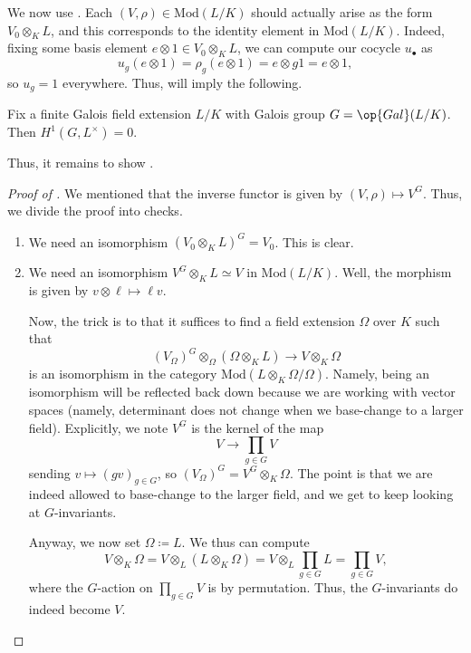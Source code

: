 \documentclass[../notes.tex]{subfiles}
\begin{document}
We now use . Each $(V,\rho)\in\mathrm{Mod}(L/K)$ should actually arise as the form $V_0\otimes_KL$, and this corresponds to the identity element in $\mathrm{Mod}(L/K)$. Indeed, fixing some basis element $e\otimes1\in V_0\otimes_KL$, we can compute our cocycle $u_\bullet$ as
\[u_g(e\otimes1)=\rho_g(e\otimes1)=e\otimes g1=e\otimes1,\]
so $u_g=1$ everywhere. Thus,  will imply the following.
\begin{theorem}[Hilbert 90]
	Fix a finite Galois field extension $L/K$ with Galois group $G=\op{Gal}(L/K)$. Then $H^1(G,L^\times)=0$.
\end{theorem}
Thus, it remains to show .
\begin{proof}[Proof of ]
	We mentioned that the inverse functor is given by $(V,\rho)\mapsto V^G$. Thus, we divide the proof into checks.
	\begin{enumerate}
		\item We need an isomorphism $(V_0\otimes_KL)^G=V_0$. This is clear.
		\item We need an isomorphism $V^G\otimes_KL\simeq V$ in $\mathrm{Mod}(L/K)$. Well, the morphism is given by $v\otimes\ell\mapsto\ell v$.

		Now, the trick is to that it suffices to find a field extension $\Omega$ over $K$ such that
		\[(V_\Omega)^G\otimes_\Omega(\Omega\otimes_KL)\to V\otimes_K\Omega\]
		is an isomorphism in the category $\mathrm{Mod}(L\otimes_K\Omega/\Omega)$. Namely, being an isomorphism will be reflected back down because we are working with vector spaces (namely, determinant does not change when we base-change to a larger field). Explicitly, we note $V^G$ is the kernel of the map
		\[V\to\prod_{g\in G}V\]
		sending $v\mapsto(gv)_{g\in G}$, so $(V_\Omega)^G=V^G\otimes_K\Omega$. The point is that we are indeed allowed to base-change to the larger field, and we get to keep looking at $G$-invariants.

		Anyway, we now set $\Omega\coloneqq L$. We thus can compute
		\[V\otimes_K\Omega=V\otimes_L(L\otimes_K\Omega)=V\otimes_L\prod_{g\in G}L=\prod_{g\in G}V,\]
		where the $G$-action on $\prod_{g\in G}V$ is by permutation. Thus, the $G$-invariants do indeed become $V$.
		\qedhere
	\end{enumerate}
\end{proof}
\end{document}
